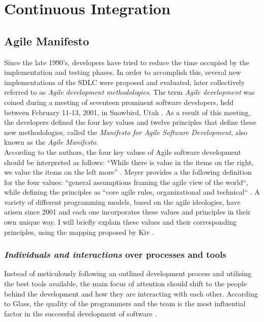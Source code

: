 \section{Continuous Integration}
\subsection{Agile Manifesto}
Since the late 1990's, developers have tried to reduce the time occupied by the implementation and testing phases. In order to accomplish this, several new implementations of the SDLC were proposed and evaluated, later collectively referred to as \emph{Agile development methodologies}. The term \emph{Agile development} was coined during a meeting of seventeen prominent software developers, held between February 11-13, 2001, in Snowbird, Utah \cite{jimhighsmith2001}. As a result of this meeting, the developers defined the four key values and twelve principles that define these new methodologies, called the \emph{Manifesto for Agile Software Development}, also known as the \emph{Agile Manifesto}.\\

\noindent According to the authors, the four key values of Agile software development should be interpreted as follows: ``While there is value in the items on the right, we value the items on the left more'' \cite{beck2001agile}. Meyer provides a the following definition for the four values: ``general assumptions framing the agile view of the world``, while defining the principles as ``core agile rules, organizational and technical`` \cite[p.~2]{Meyer2014}. A variety of different programming models, based on the agile ideologies, have arisen since 2001 and each one incorporates these values and principles in their own unique way. I will briefly explain these values and their corresponding principles, using the mapping proposed by Kiv \cite[p.~12]{10.1007/978-3-030-03673-7_2}.

\subsubsection{\emph{Individuals and interactions} over processes and tools}
Instead of meticulously following an outlined development process and utilising the best tools available, the main focus of attention should shift to the people behind the development and how they are interacting with each other. According to Glass, the quality of the programmers and the team is the most influential factor in the successful development of software \cite{glass2001agile}. 


